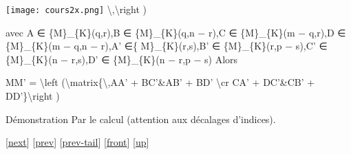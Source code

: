\documentclass[]{article}
\begin{document}
\texttt{[image: cours2x.png]} \textbackslash{},\textbackslash{}right )

avec A ∈ \{M\}\_\{K\}(q,r),B ∈ \{M\}\_\{K\}(q,n − r),C ∈ \{M\}\_\{K\}(m
− q,r),D ∈ \{M\}\_\{K\}(m − q,n − r),A' ∈\{ M\}\_\{K\}(r,s),B' ∈
\{M\}\_\{K\}(r,p − s),C' ∈ \{M\}\_\{K\}(n − r,s),D' ∈ \{M\}\_\{K\}(n −
r,p − s) Alors

MM' = \textbackslash{}left (\textbackslash{}matrix\{\textbackslash{},AA'
+ BC'\&AB' + BD' \textbackslash{}cr CA' + DC'\&CB' +
DD'\}\textbackslash{}right )

Démonstration Par le calcul (attention aux décalages d'indices).

{[}\href{coursse13.html}{next}{]} {[}\href{coursse11.html}{prev}{]}
{[}\href{coursse11.html\#tailcoursse11.html}{prev-tail}{]}
{[}\href{coursse12.html}{front}{]}
{[}\href{coursch3.html\#coursse12.html}{up}{]}
\end{document}
